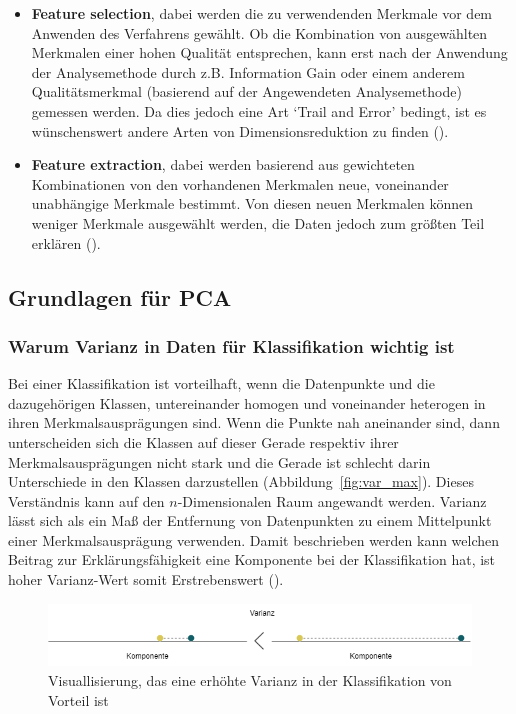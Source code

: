 \documentclass[envcountsame, envcountchap, deutsch]{i-studis}
\begin{document}
\begin{itemize}
    \item \textbf{Feature selection}, dabei werden die zu verwendenden Merkmale vor dem Anwenden des Verfahrens gewählt. 
    Ob die Kombination von ausgewählten Merkmalen einer hohen Qualität entsprechen, kann erst nach der Anwendung der Analysemethode durch z.B. 
    Information Gain oder einem anderem Qualitätsmerkmal (basierend auf der Angewendeten Analysemethode) gemessen werden. Da dies jedoch eine Art `Trail and Error' bedingt, 
    ist es wünschenswert andere Arten von Dimensionsreduktion zu finden (\cite[p.2]{Lavrenko_Sutton_2011_pca}).
    \item \textbf{Feature extraction}, dabei werden basierend aus gewichteten Kombinationen von den vorhandenen Merkmalen neue, voneinander unabhängige Merkmale bestimmt. 
    Von diesen neuen Merkmalen können weniger Merkmale ausgewählt werden, die Daten jedoch zum größten Teil erklären (\cite[p.2]{Lavrenko_Sutton_2011_pca}).
\end{itemize}
\subsection{Grundlagen für PCA}
\subsubsection{Warum Varianz in Daten für Klassifikation wichtig ist}
Bei einer Klassifikation ist vorteilhaft, wenn die Datenpunkte und die dazugehörigen Klassen, untereinander homogen und voneinander heterogen in ihren Merkmalsausprägungen sind.
Wenn die Punkte nah aneinander sind, dann unterscheiden sich die Klassen auf dieser Gerade respektiv ihrer Merkmalsausprägungen nicht stark und 
die Gerade ist schlecht darin Unterschiede in den Klassen darzustellen (Abbildung~\ref{fig:var_max}). Dieses Verständnis kann auf den $n$-Dimensionalen Raum angewandt werden. 
Varianz lässt sich als ein Maß der Entfernung von Datenpunkten zu einem Mittelpunkt einer Merkmalsausprägung verwenden. Damit beschrieben werden kann welchen Beitrag zur Erklärungsfähigkeit eine Komponente bei der Klassifikation hat, 
ist hoher Varianz-Wert somit Erstrebenswert (\cite[p.3]{Lavrenko_Sutton_2011_pca}).

\vspace{1ex}
\begin{figure}
    \includegraphics[width=\textwidth]{comparison_variance_two_points.drawio.png}
    \caption{Visuallisierung, das eine erhöhte Varianz in der Klassifikation von Vorteil ist}
\end{figure}
\end{document}
